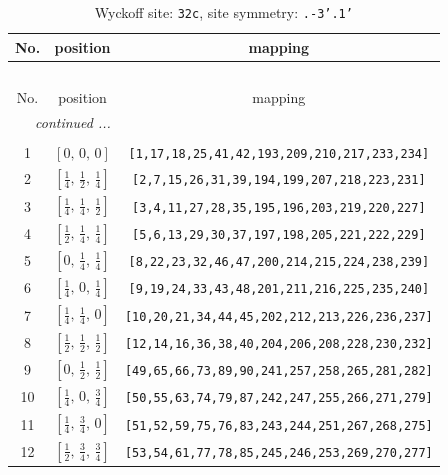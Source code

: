 \documentclass[fleqn,8pt]{jsarticle}
\begin{document}
\begin{longtable}{ccc}
\caption{Wyckoff site: {\tt 32c}, site symmetry: {\tt .-3'.1'}}
 \\
 \hline \hline
No. & position & mapping \\ \hline \endfirsthead

\multicolumn{2}{l}{\tablename\ \thetable{}} \\
 \hline \hline
No. & position & mapping \\ \hline \endhead

 \hline \hline
\multicolumn{2}{r}{\footnotesize\it continued ...} \\ \endfoot

 \hline \hline
\multicolumn{2}{r}{} \\ \endlastfoot

1 & $\left[ 0,\, 0,\, 0 \right]$ & {\tt [1,17,18,25,41,42,193,209,210,217,233,234]} \\ \hline
2 & $\left[ \frac{1}{4},\, \frac{1}{2},\, \frac{1}{4} \right]$ & {\tt [2,7,15,26,31,39,194,199,207,218,223,231]} \\ \hline
3 & $\left[ \frac{1}{4},\, \frac{1}{4},\, \frac{1}{2} \right]$ & {\tt [3,4,11,27,28,35,195,196,203,219,220,227]} \\ \hline
4 & $\left[ \frac{1}{2},\, \frac{1}{4},\, \frac{1}{4} \right]$ & {\tt [5,6,13,29,30,37,197,198,205,221,222,229]} \\ \hline
5 & $\left[ 0,\, \frac{1}{4},\, \frac{1}{4} \right]$ & {\tt [8,22,23,32,46,47,200,214,215,224,238,239]} \\ \hline
6 & $\left[ \frac{1}{4},\, 0,\, \frac{1}{4} \right]$ & {\tt [9,19,24,33,43,48,201,211,216,225,235,240]} \\ \hline
7 & $\left[ \frac{1}{4},\, \frac{1}{4},\, 0 \right]$ & {\tt [10,20,21,34,44,45,202,212,213,226,236,237]} \\ \hline
8 & $\left[ \frac{1}{2},\, \frac{1}{2},\, \frac{1}{2} \right]$ & {\tt [12,14,16,36,38,40,204,206,208,228,230,232]} \\ \hline
9 & $\left[ 0,\, \frac{1}{2},\, \frac{1}{2} \right]$ & {\tt [49,65,66,73,89,90,241,257,258,265,281,282]} \\ \hline
10 & $\left[ \frac{1}{4},\, 0,\, \frac{3}{4} \right]$ & {\tt [50,55,63,74,79,87,242,247,255,266,271,279]} \\ \hline
11 & $\left[ \frac{1}{4},\, \frac{3}{4},\, 0 \right]$ & {\tt [51,52,59,75,76,83,243,244,251,267,268,275]} \\ \hline
12 & $\left[ \frac{1}{2},\, \frac{3}{4},\, \frac{3}{4} \right]$ & {\tt [53,54,61,77,78,85,245,246,253,269,270,277]} \\ \hline

\end{longtable}
\end{document}
